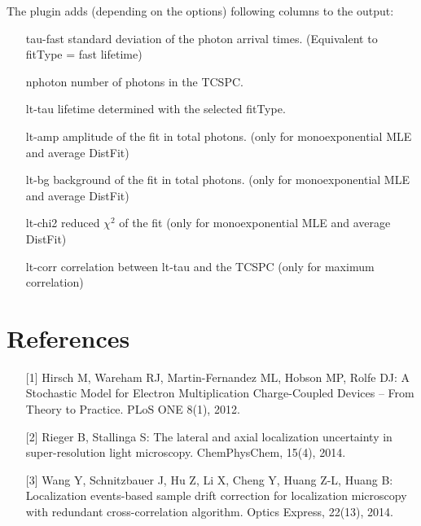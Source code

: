\documentclass[11pt,onside]{report}
\numberwithin{equation}{chapter}
\begin{document}
The plugin adds (depending on the options) following columns to the output:
\begin{itemize}[leftmargin=3cm]
	\item[\textsf{tau-fast}] standard deviation of the photon arrival times. (Equivalent to \textsf{fitType} = \textsf{fast lifetime})
	\item[\textsf{nphoton}] number of photons in the TCSPC.
	\item[\textsf{lt-tau}] lifetime determined with the selected \textsf{fitType}.
	\item[\textsf{lt-amp}] amplitude of the fit in total photons. (only for \textsf{monoexponential MLE} and \textsf{average DistFit})
	\item[\textsf{lt-bg}] background of the fit in total photons. (only for \textsf{monoexponential MLE} and \textsf{average DistFit})
	\item[\textsf{lt-chi2}] reduced $\chi^2$ of the fit (only for \textsf{monoexponential MLE} and \textsf{average DistFit})
	\item[\textsf{lt-corr}] correlation between \textsf{lt-tau} and the TCSPC  (only for \textsf{maximum correlation})
\end{itemize}
\clearpage

\section{References}
\begin{itemize}
\item [{[1]}]  Hirsch M, Wareham RJ, Martin-Fernandez ML, Hobson MP, Rolfe DJ: A Stochastic Model for Electron Multiplication Charge-Coupled Devices {--} From Theory to Practice. PLoS ONE 8(1), 2012.
\item[{[2]}] Rieger B, Stallinga S: The lateral and axial localization uncertainty in super-resolution light microscopy. ChemPhysChem, 15(4), 2014.
\item[{[3]}] Wang Y, Schnitzbauer J, Hu Z, Li X, Cheng Y, Huang Z-L, Huang B: Localization events-based sample drift correction for localization microscopy with redundant cross-correlation algorithm. Optics Express, 22(13), 2014.
\end{itemize}
\end{document}
